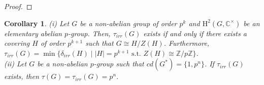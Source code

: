 \documentclass[a4paper,11pt]{amsart}
\numberwithin{equation}{section}
\numberwithin{equation}{subsection}
\newtheorem{corollary}[theorem]{Corollary}
\newcommand{\C}{\mathbb{C}}
\newcommand{\Z}{\mathbb{Z}}
\newcommand{\GL}{\mathrm{GL}}
\newcommand{\poonam}[1]{{\color{blue} #1}}
\begin{document}
\begin{proof}
\end{proof}

\begin{corollary} \label{Elementary abelian Schur multiplier}
(i) Let $G$ be a non-abelian group of order $p^k$ and $\mathrm{H}^2(G, \C^{\times})$ be an elementary abelian $p$-group. Then, $\tau_{irr}(G)$ exists if and only if there exists a covering $H$ of order $p^{k+1}$ such that $G \cong H/Z(H)$. Furthermore, $\tau_{irr}(G) = \min\{\delta_{irr}(H) \mid |H|=p^{k+1} \text{ s.t. } Z(H) \cong \Z/p\Z \}$.\\
(ii) Let $G$ be a non-abelian $p$-group such that $cd(G^*)= \{1, p^n\}$. If $\tau_{irr}(G)$ exists, then $\tau(G)= \tau_{irr}(G)= p^n$. 
\end{corollary}
\end{document}
